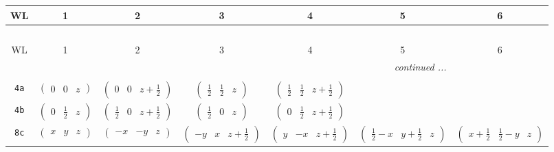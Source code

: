 \documentclass[fleqn,9pt,landscape]{jsarticle}
\begin{document}
\begin{center}
\renewcommand{\arraystretch}{1.2}
\begin{longtable}{ccccccc}
 \hline \hline
WL & 1 & 2 & 3 & 4 & 5 & 6 \\ \hline \endfirsthead

\multicolumn{6}{l}{\tablename\ \thetable{}} \\
 \hline \hline
WL & 1 & 2 & 3 & 4 & 5 & 6 \\ \hline \endhead

 \hline \hline
\multicolumn{6}{r}{\footnotesize\it continued ...} \\ \endfoot

 \hline \hline
\multicolumn{6}{r}{} \\ \endlastfoot

{\tt 4a} & $ \begin{pmatrix} 0 & 0 & z \end{pmatrix} $ & $ \begin{pmatrix} 0 & 0 & z + \frac{1}{2} \end{pmatrix} $ & $ \begin{pmatrix} \frac{1}{2} & \frac{1}{2} & z \end{pmatrix} $ & $ \begin{pmatrix} \frac{1}{2} & \frac{1}{2} & z + \frac{1}{2} \end{pmatrix} $ & $  $ & $  $ \\ \hline
{\tt 4b} & $ \begin{pmatrix} 0 & \frac{1}{2} & z \end{pmatrix} $ & $ \begin{pmatrix} \frac{1}{2} & 0 & z + \frac{1}{2} \end{pmatrix} $ & $ \begin{pmatrix} \frac{1}{2} & 0 & z \end{pmatrix} $ & $ \begin{pmatrix} 0 & \frac{1}{2} & z + \frac{1}{2} \end{pmatrix} $ & $  $ & $  $ \\ \hline
{\tt 8c} & $ \begin{pmatrix} x & y & z \end{pmatrix} $ & $ \begin{pmatrix} - x & - y & z \end{pmatrix} $ & $ \begin{pmatrix} - y & x & z + \frac{1}{2} \end{pmatrix} $ & $ \begin{pmatrix} y & - x & z + \frac{1}{2} \end{pmatrix} $ & $ \begin{pmatrix} \frac{1}{2} - x & y + \frac{1}{2} & z \end{pmatrix} $ & $ \begin{pmatrix} x + \frac{1}{2} & \frac{1}{2} - y & z \end{pmatrix} $ \\

\end{longtable}
\end{center}
\end{document}
